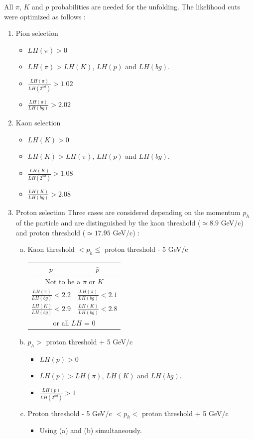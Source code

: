 All $\pi$, $K$ and $p$ probabilities are needed for the unfolding. The likelihood cuts were optimized as follows :

\begin{enumerate}
  \item Pion selection
  \begin{itemize}
    \item $LH(\pi) > 0$
    \item $LH(\pi) > LH(K)$, $LH(p)$ and $LH(bg)$.
    \item $\frac{LH(\pi)}{LH(2^{nd})}>1.02$
    \item $\frac{LH(\pi)}{LH(bg)}>2.02$
  \end{itemize}
  \item Kaon selection
  \begin{itemize}
    \item $LH(K) > 0$
    \item $LH(K) > LH(\pi)$, $LH(p)$ and $LH(bg)$.
    \item $\frac{LH(K)}{LH(2^{nd})}>1.08$
    \item $\frac{LH(K)}{LH(bg)}>2.08$
  \end{itemize}
  \item Proton selection
  Three cases are considered depending on the momentum $p_{h}$ of the particle and are distinguished by the kaon threshold ($\simeq 8.9$ GeV/c) and proton threshold ($\simeq 17.95$ GeV/c) :
  \begin{enumerate}[(a)]
    \item Kaon threshold $< p_{h} \leq$ proton threshold - 5 GeV/c
	  \begin{center}
		  \begin{tabular}{c|c}
		    \hline
		     $p$ & $\bar{p}$ \\
		    \hline
				\multicolumn{2}{c}{Not to be a $\pi$ or $K$} \\
		    $\frac{LH(\pi)}{LH(bg)} < 2.2$ & $\frac{LH(\pi)}{LH(bg)} < 2.1$ \\
		    $\frac{LH(K)}{LH(bg)} < 2.9$ & $\frac{LH(K)}{LH(bg)} < 2.8$ \\
		    \hline
				\multicolumn{2}{c}{or all $LH$ = 0} \\
				\hline
		  \end{tabular}
		\end{center}
    \item $p_{h} >$ proton threshold + 5 GeV/c
    \begin{itemize}
      \item $LH(p) > 0$
      \item $LH(p) > LH(\pi)$, $LH(K)$ and $LH(bg)$.
      \item $\frac{LH(p)}{LH(2^{nd})}>1$
    \end{itemize}
    \item Proton threshold - 5 GeV/c $< p_{h} <$ proton threshold + 5 GeV/c
    \begin{itemize}
      \item Using (a) and (b) simultaneously.
    \end{itemize}
  \end{enumerate}
\end{enumerate}

